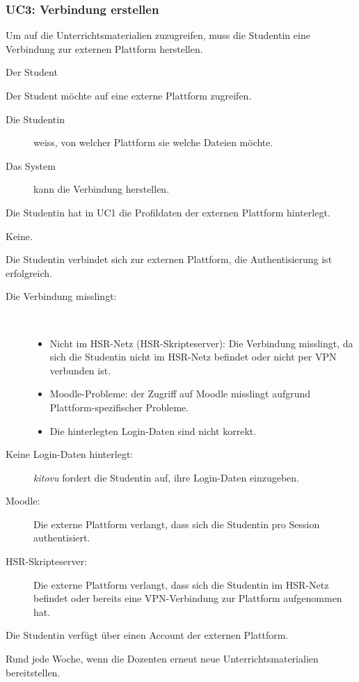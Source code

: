 \documentclass[a4paper]{article}
\begin{document}
\subsubsection{UC3: Verbindung erstellen}
\begin{description}[uclist]
  \item[Goal] Um auf die Unterrichtsmaterialien zuzugreifen, muss die Studentin eine Verbindung zur externen Plattform herstellen.
  \item[Primary Actor] Der Student
  \item[Trigger] Der Student möchte auf eine externe Plattform zugreifen.
  \item[Stakeholders and Interests]
    \begin{description}
      \item[Die Studentin] weiss, von welcher Plattform sie welche Dateien möchte.
      \item[Das System] kann die Verbindung herstellen.
    \end{description}
  \item[Preconditions] Die Studentin hat in UC1 die Profildaten der externen Plattform hinterlegt.
  \item[Postconditions] Keine.
  \item[Main Success Scenario] Die Studentin verbindet sich zur externen Plattform, die Authentisierung ist erfolgreich.
  \item[Extensions]
    \begin{description}
      \item[Die Verbindung misslingt:] \strut \\[-1em]
        \begin{itemize}[leftmargin=1em]
          \item Nicht im HSR-Netz (HSR-Skripteserver): Die Verbindung misslingt, da sich die Studentin nicht im HSR-Netz befindet oder nicht per VPN verbunden ist.
          \item Moodle-Probleme: der Zugriff auf Moodle misslingt aufgrund Plattform-spezifischer Probleme.
          \item Die hinterlegten Login-Daten sind nicht korrekt.
        \end{itemize}
      \item[Keine Login-Daten hinterlegt:] \emph{kitovu} fordert die Studentin auf, ihre Login-Daten einzugeben.
      \item[Moodle:] Die externe Plattform verlangt, dass sich die Studentin pro Session authentisiert.
      \item[HSR-Skripteserver:] Die externe Plattform verlangt, dass sich die Studentin im HSR-Netz befindet oder bereits eine VPN-Verbindung zur Plattform aufgenommen hat.
    \end{description}
  \item[Special Requirements] Die Studentin verfügt über einen Account der externen Plattform.
  \item[Frequency of Occurrence] Rund jede Woche, wenn die Dozenten erneut neue Unterrichtsmaterialien bereitstellen.
\end{description}
\end{document}
